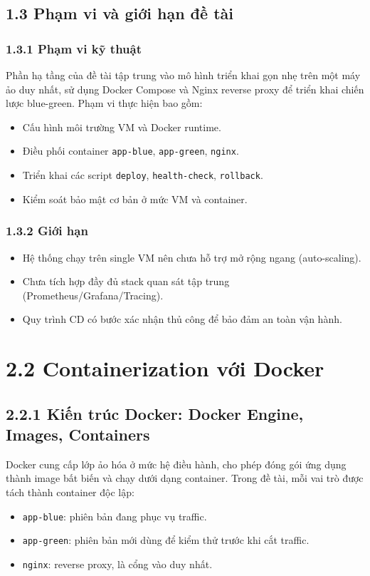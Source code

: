 
\subsection*{1.3 Phạm vi và giới hạn đề tài}
\subsubsection*{1.3.1 Phạm vi kỹ thuật}
Phần hạ tầng của đề tài tập trung vào mô hình triển khai gọn nhẹ trên một máy ảo duy nhất, sử dụng Docker Compose và Nginx reverse proxy để triển khai chiến lược blue-green. Phạm vi thực hiện bao gồm:
\begin{itemize}
  \item Cấu hình môi trường VM và Docker runtime.
  \item Điều phối container \texttt{app-blue}, \texttt{app-green}, \texttt{nginx}.
  \item Triển khai các script \texttt{deploy}, \texttt{health-check}, \texttt{rollback}.
  \item Kiểm soát bảo mật cơ bản ở mức VM và container.
\end{itemize}

\subsubsection*{1.3.2 Giới hạn}
\begin{itemize}
  \item Hệ thống chạy trên single VM nên chưa hỗ trợ mở rộng ngang (auto-scaling).
  \item Chưa tích hợp đầy đủ stack quan sát tập trung (Prometheus/Grafana/Tracing).
  \item Quy trình CD có bước xác nhận thủ công để bảo đảm an toàn vận hành.
\end{itemize}

\section*{2.2 Containerization với Docker}

\subsection*{2.2.1 Kiến trúc Docker: Docker Engine, Images, Containers}
Docker cung cấp lớp ảo hóa ở mức hệ điều hành, cho phép đóng gói ứng dụng thành image bất biến và chạy dưới dạng container. Trong đề tài, mỗi vai trò được tách thành container độc lập:
\begin{itemize}
  \item \texttt{app-blue}: phiên bản đang phục vụ traffic.
  \item \texttt{app-green}: phiên bản mới dùng để kiểm thử trước khi cắt traffic.
  \item \texttt{nginx}: reverse proxy, là cổng vào duy nhất.
\end{itemize}

